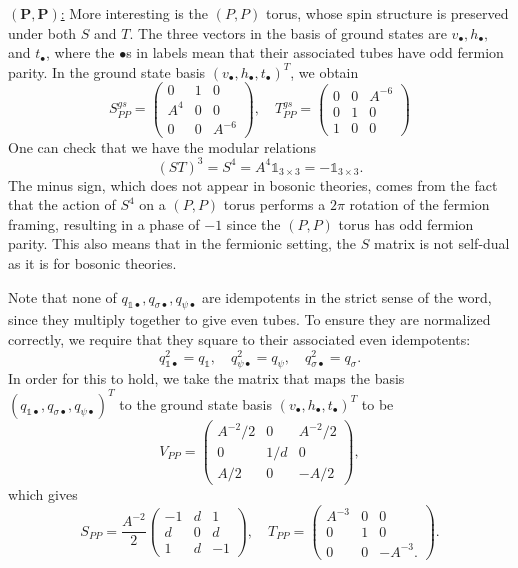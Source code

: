 \documentclass[12pt,a4paper]{article}
\newcommand{\unit}{\mathds{1}}
\newcommand\be            {\begin{equation}}
\newcommand\ee            {\end{equation}}
\begin{document}
\underline{$\mathbf{(P,P)}$:} More interesting is the $(P,P)$ torus, whose spin structure is preserved under both $S$ and $T$. The three vectors in the basis of ground states are $v_\bullet,h_\bullet,$ and $t_\bullet$,
where the $\bullet$s in labels mean that their associated tubes have odd fermion parity.
In the ground state basis $(v_\bullet,h_\bullet,t_\bullet)^T$, we obtain
\be S^{gs}_{PP} = \begin{pmatrix}0 & 1 & 0 \\ A^4 & 0 & 0 \\ 0 & 0 & A^{-6} \end{pmatrix},\quad T^{gs}_{PP} = \begin{pmatrix} 0 & 0 & A^{-6} \\ 0 & 1 & 0 \\ 1 & 0 & 0 \end{pmatrix}\ee
One can check that we have the modular relations
\be (ST)^3 = S^4= A^4\unit_{3\times3} = -\unit_{3\times 3}.\ee 
The minus sign, which does not appear in bosonic theories, comes from the fact that the action of $S^4$ on a $(P,P)$ torus performs a $2\pi$ rotation of the fermion framing, resulting in a phase of $-1$ since the $(P,P)$ torus has odd fermion parity. This also means that in the fermionic setting, the $S$ matrix is not self-dual as it is for bosonic theories. %

Note that none of $q_{\unit\bullet},q_{\sigma\bullet},q_{\psi\bullet}$ are idempotents in the strict sense of the word, since they multiply together to give even tubes. To ensure they are normalized correctly, we require that they square to their associated even idempotents:
\be q_{\unit\bullet}^2 = q_\unit,\quad q_{\psi\bullet}^2 = q_\psi,\quad q_{\sigma\bullet}^2 = q_\sigma.\ee
In order for this to hold, we %
take the matrix that maps the basis $(q_{\unit\bullet},q_{\sigma\bullet},q_{\psi\bullet})^T$ to the ground state basis $(v_\bullet,h_\bullet,t_\bullet)^T$ to be 
\be V_{PP} = \begin{pmatrix} A^{-2}/2 & 0 & A^{-2}/2 \\ 0 & 1/d & 0 \\ A/2 & 0 & -A/2 \end{pmatrix},\ee
which gives 
\be S_{PP} = \frac{A^{-2}}{2} \begin{pmatrix} -1 & d & 1 \\ d & 0 & d \\ 1 & d & -1 \end{pmatrix},\quad T_{PP} = \begin{pmatrix} A^{-3} & 0 & 0 \\ 0 & 1 & 0 \\ 0& 0& -A^{-3}.\end{pmatrix}.\ee
\end{document}
